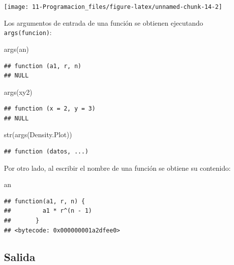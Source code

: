 \documentclass[
]{book}
\newenvironment{Shaded}{\begin{snugshade}}{\end{snugshade}}
\newcommand{\FunctionTok}[1]{\textcolor[rgb]{0.00,0.00,0.00}{#1}}
\newcommand{\NormalTok}[1]{#1}
\theoremstyle{break}
\begin{document}
\begin{center}\texttt{[image: 11-Programacion\_files/figure-latex/unnamed-chunk-14-2]} \end{center}

Los argumentos de entrada de una función se obtienen ejecutando \texttt{args(funcion)}:

\begin{Shaded}
\begin{Highlighting}[]
\FunctionTok{args}\NormalTok{(an)}
\end{Highlighting}
\end{Shaded}

\begin{verbatim}
## function (a1, r, n) 
## NULL
\end{verbatim}

\begin{Shaded}
\begin{Highlighting}[]
\FunctionTok{args}\NormalTok{(xy2)}
\end{Highlighting}
\end{Shaded}

\begin{verbatim}
## function (x = 2, y = 3) 
## NULL
\end{verbatim}

\begin{Shaded}
\begin{Highlighting}[]
\FunctionTok{str}\NormalTok{(}\FunctionTok{args}\NormalTok{(Density.Plot))}
\end{Highlighting}
\end{Shaded}

\begin{verbatim}
## function (datos, ...)
\end{verbatim}

Por otro lado, al escribir el nombre de una función se obtiene su
contenido:

\begin{Shaded}
\begin{Highlighting}[]
\NormalTok{an}
\end{Highlighting}
\end{Shaded}

\begin{verbatim}
## function(a1, r, n) {
##         a1 * r^(n - 1)
##       }
## <bytecode: 0x000000001a2dfee0>
\end{verbatim}

\hypertarget{salida}{%
\subsection{Salida}\label{salida}}
\end{document}
